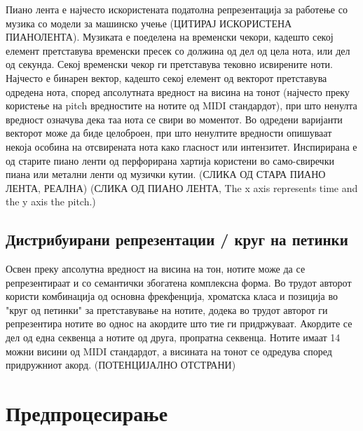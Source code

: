 Пиано лента е најчесто искористената податолна репрезентација за работење со музика со модели за машинско учење (ЦИТИРАЈ ИСКОРИСТЕНА ПИАНОЛЕНТА). Музиката е поеделена на временски чекори, кадешто секој елемент претставува временски пресек со должина од дел од цела нота, или дел од секунда. Секој временски чекор ги претставува тековно исвирените ноти. Најчесто е бинарен вектор, кадешто секој елемент од векторот претставува одредена нота, според апсолутната вредност на висина на тонот (најчесто преку користење на pitch вредностите на нотите од MIDI стандардот), при што ненулта вредност означува дека таа нота се свири во моментот. Во одредени варијанти векторот може да биде целоброен, при што ненултите вредности опишуваат некоја особина на отсвирената нота како гласност или интензитет. Инспирирана е од старите пиано ленти од перфорирана хартија користени во само-свиречки пиана или метални ленти од музички кутии.
(СЛИКА ОД СТАРА ПИАНО ЛЕНТА, РЕАЛНА)
(СЛИКА ОД ПИАНО ЛЕНТА, The x axis represents time and the y axis the pitch.)

\subsection{Дистрибуирани репрезентации / круг на петинки}

Освен преку апсолутна вредност на висина на тон, нотите може да се репрезентираат и со семантички збогатена комплексна форма. Во трудот \cite{Mozer1994} авторот користи комбинација од основна фрекфенција, хроматска класа и позиција во "круг од петинки" за претставување на нотите, додека во трудот \cite{Biles1994} авторот ги репрезентира нотите во однос на акордите што тие ги придржуваат. Акордите се дел од една секвенца а нотите од друга, пропратна секвенца. Нотите имаат 14 можни висини од MIDI стандардот, а висината на тонот се одредува според придружниот акорд.
(ПОТЕНЦИЈАЛНО ОТСТРАНИ)

\section{Предпроцесирање}

